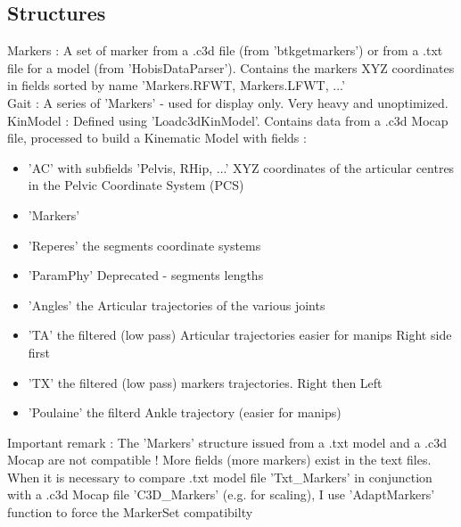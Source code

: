 \documentclass{article}
\begin{document}
\subsection{Structures}

Markers : A set of marker from a .c3d file (from 'btkgetmarkers') or from a .txt file for a model (from 'HobisDataParser'). Contains the markers XYZ coordinates in fields sorted by name 'Markers.RFWT, Markers.LFWT, ...'\\

Gait : A series of 'Markers' - used for display only. Very heavy and unoptimized.\\

KinModel : Defined using 'Loadc3dKinModel'. Contains data from a .c3d Mocap file, processed to build a Kinematic Model with fields :
\begin{itemize}
    \item 'AC' with subfields 'Pelvis, RHip, ...' XYZ coordinates of the articular centres in the Pelvic Coordinate System (PCS) 

    \item 'Markers'
    
    \item 'Reperes' the segments coordinate systems

    \item 'ParamPhy' Deprecated - segments lengths

    \item 'Angles' the Articular trajectories of the various joints 
    
    \item 'TA' the filtered (low pass) Articular trajectories easier for manips Right side first
    
    \item 'TX' the filtered (low pass) markers trajectories. Right then Left
    
    \item 'Poulaine' the filterd Ankle trajectory (easier for manips)
    
\end{itemize}

Important remark : The 'Markers' structure issued from a .txt model and a .c3d Mocap are not compatible ! 
More fields (more markers) exist in the text files. When it is necessary to compare .txt model file 'Txt\_Markers' in conjunction with a .c3d Mocap file 'C3D\_Markers' (e.g. for scaling), I use 'AdaptMarkers' function to force the MarkerSet compatibilty \\
\end{document}
